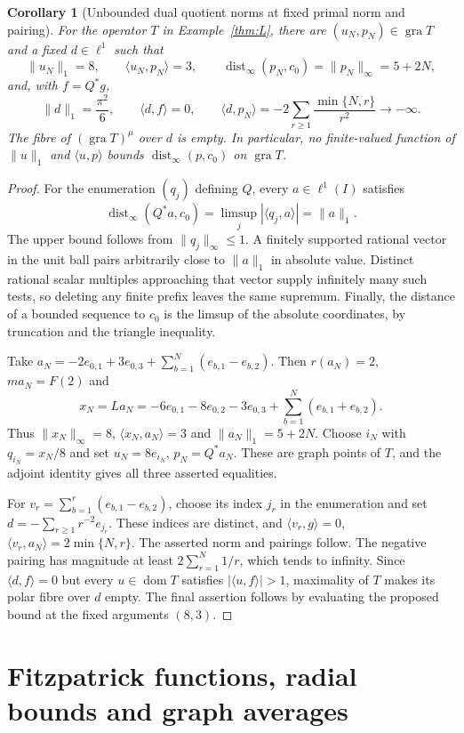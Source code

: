 \documentclass[11pt]{article}
\newcommand{\gra}{\operatorname{gra}}
\newcommand{\dom}{\operatorname{dom}}
\newcommand{\pair}[2]{\langle #1,#2\rangle}
\newtheorem{corollary}{Corollary}
\theoremstyle{definition}
\theoremstyle{remark}
\newcommand{\dist}{\operatorname{dist}}
\begin{document}
\begin{corollary}[Unbounded dual quotient norms at fixed primal norm and pairing]
\label{cor:dual-quotient-recovered}
For the operator $T$ in Example~\ref{thm:L}, there are $(u_N,p_N)\in\gra T$ and a fixed $d\in\ell^1$ such that
\[
\|u_N\|_1=8,\qquad \pair{u_N}{p_N}=3,\qquad
\dist_\infty(p_N,c_0)=\|p_N\|_\infty=5+2N,
\]
and, with $f=Q^*g$,
\[
\|d\|_1=\frac{\pi^2}{6},\qquad \pair{d}{f}=0,\qquad
\pair{d}{p_N}=-2\sum_{r\ge1}\frac{\min\{N,r\}}{r^2}\longrightarrow-\infty.
\]
The fibre of $(\gra T)^\mu$ over $d$ is empty. In particular, no finite-valued function of $\|u\|_1$ and $\pair{u}{p}$ bounds $\dist_\infty(p,c_0)$ on $\gra T$.
\end{corollary}
\begin{proof}
For the enumeration $(q_j)$ defining $Q$, every $a\in\ell^1(I)$ satisfies
\[
\dist_\infty(Q^*a,c_0)=\limsup_j|\pair{q_j}{a}|=\|a\|_1.
\]
The upper bound follows from $\|q_j\|_\infty\le1$. A finitely supported rational vector in the unit ball pairs arbitrarily close to $\|a\|_1$ in absolute value. Distinct rational scalar multiples approaching that vector supply infinitely many such tests, so deleting any finite prefix leaves the same supremum. Finally, the distance of a bounded sequence to $c_0$ is the limsup of the absolute coordinates, by truncation and the triangle inequality.

Take $a_N=-2e_{0,1}+3e_{0,3}+\sum_{b=1}^N(e_{b,1}-e_{b,2})$. Then $r(a_N)=2$, $ma_N=F(2)$ and
\[
x_N=La_N=-6e_{0,1}-8e_{0,2}-3e_{0,3}+\sum_{b=1}^N(e_{b,1}+e_{b,2}).
\]
Thus $\|x_N\|_\infty=8$, $\pair{x_N}{a_N}=3$ and $\|a_N\|_1=5+2N$. Choose $i_N$ with $q_{i_N}=x_N/8$ and set $u_N=8e_{i_N}$, $p_N=Q^*a_N$. These are graph points of $T$, and the adjoint identity gives all three asserted equalities.

For $v_r=\sum_{b=1}^r(e_{b,1}-e_{b,2})$, choose its index $j_r$ in the enumeration and set $d=-\sum_{r\ge1}r^{-2}e_{j_r}$. These indices are distinct, and $\pair{v_r}{g}=0$, $\pair{v_r}{a_N}=2\min\{N,r\}$. The asserted norm and pairings follow. The negative pairing has magnitude at least $2\sum_{r=1}^N1/r$, which tends to infinity. Since $\pair{d}{f}=0$ but every $u\in\dom T$ satisfies $|\pair{u}{f}|>1$, maximality of $T$ makes its polar fibre over $d$ empty. The final assertion follows by evaluating the proposed bound at the fixed arguments $(8,3)$.
\end{proof}

\section{Fitzpatrick functions, radial bounds and graph averages}
\label{app:fitzpatrick}
\end{document}
